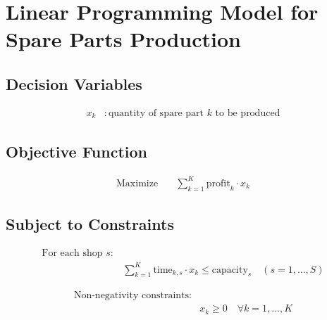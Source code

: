\documentclass{article}
\begin{document}
\section*{Linear Programming Model for Spare Parts Production}

\subsection*{Decision Variables}
\begin{align*}
x_k & : \text{quantity of spare part } k \text{ to be produced}
\end{align*}

\subsection*{Objective Function}
\begin{align*}
\text{Maximize} \quad & \sum_{k=1}^{K} \text{profit}_k \cdot x_k
\end{align*}

\subsection*{Subject to Constraints}
\begin{align*}
\text{For each shop } s: \\
& \sum_{k=1}^{K} \text{time}_{k, s} \cdot x_k \leq \text{capacity}_s \quad (s = 1, \ldots, S)
\end{align*}

\begin{align*}
\text{Non-negativity constraints:} \\
& x_k \geq 0 \quad \forall k = 1, \ldots, K
\end{align*}
\end{document}
